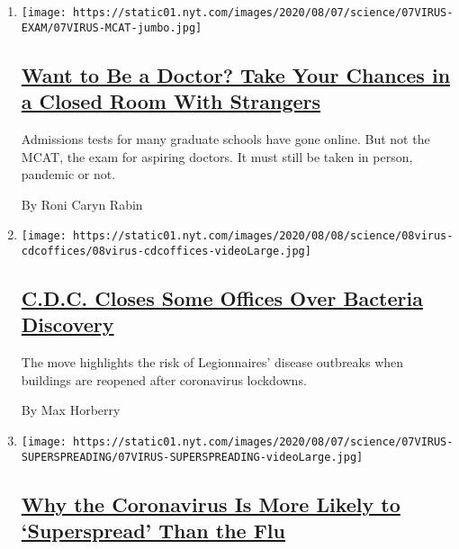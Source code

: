 \begin{enumerate}
\def\labelenumi{\arabic{enumi}.}
\item
  \texttt{[image: https://static01.nyt.com/images/2020/08/07/science/07VIRUS-EXAM/07VIRUS-MCAT-jumbo.jpg]}

  \hypertarget{want-to-be-a-doctor-take-your-chances-in-a-closed-room-with-strangers}{%
  \subsection{\texorpdfstring{\href{/2020/08/07/health/coronavirus-exams-mcat.html}{Want
  to Be a Doctor? Take Your Chances in a Closed Room With
  Strangers}}{Want to Be a Doctor? Take Your Chances in a Closed Room With Strangers}}\label{want-to-be-a-doctor-take-your-chances-in-a-closed-room-with-strangers}}

  Admissions tests for many graduate schools have gone online. But not
  the MCAT, the exam for aspiring doctors. It must still be taken in
  person, pandemic or not.

  By Roni Caryn Rabin
\item
  \texttt{[image: https://static01.nyt.com/images/2020/08/08/science/08virus-cdcoffices/08virus-cdcoffices-videoLarge.jpg]}

  \hypertarget{cdc-closes-some-offices-over-bacteria-discovery}{%
  \subsection{\texorpdfstring{\href{/2020/08/08/health/cdc-legionnaires-coronavirus.html}{C.D.C.
  Closes Some Offices Over Bacteria
  Discovery}}{C.D.C. Closes Some Offices Over Bacteria Discovery}}\label{cdc-closes-some-offices-over-bacteria-discovery}}

  The move highlights the risk of Legionnaires' disease outbreaks when
  buildings are reopened after coronavirus lockdowns.

  By Max Horberry
\item
  \texttt{[image: https://static01.nyt.com/images/2020/08/07/science/07VIRUS-SUPERSPREADING/07VIRUS-SUPERSPREADING-videoLarge.jpg]}

  \hypertarget{why-the-coronavirus-is-more-likely-to-superspread-than-the-flu}{%
  \subsection{\texorpdfstring{\href{/2020/08/07/health/coronavirus-superspreading-contagion.html}{Why
  the Coronavirus Is More Likely to `Superspread' Than the
  Flu}}{Why the Coronavirus Is More Likely to `Superspread' Than the Flu}}\label{why-the-coronavirus-is-more-likely-to-superspread-than-the-flu}}


\end{enumerate}
